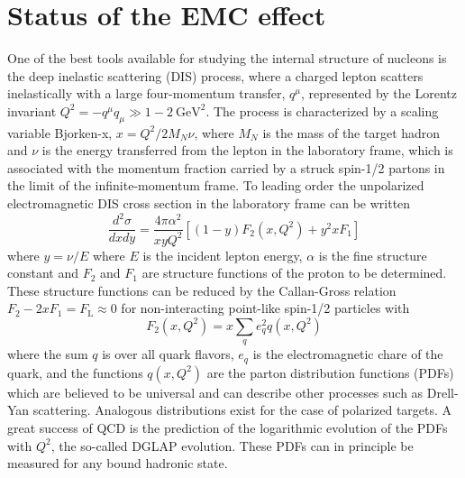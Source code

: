 \section{Status of the EMC effect}

One of the best tools available for studying the internal structure of nucleons is the deep inelastic
scattering (DIS) process, where a charged lepton scatters inelastically with a large four-momentum
transfer, $q^\mu$, represented by the Lorentz invariant $Q^2 = -q^\mu q_\mu \gg 1-2~\mathrm{GeV}^2$.
The process is characterized by a scaling variable Bjorken-x, $x = Q^2/2M_N \nu$, 
where $M_N$ is the mass of the target hadron and $\nu$ is the energy transferred from the lepton in the laboratory frame,
which is associated with the momentum fraction carried by a struck spin-1/2 partons in the limit of the infinite-momentum frame.
To leading order the unpolarized electromagnetic DIS cross section in the laboratory frame can be written~\cite{PhysRevD.98.030001}
\begin{equation}
    \frac{d^2 \sigma}{dx dy} = \frac{4 \pi \alpha^2}{x y Q^2} \left[ (1-y)F_2(x, Q^2) + y^2 x F_1 \right]
\end{equation}
where $y = \nu/E$ where $E$ is the incident lepton energy, $\alpha$ is the fine structure constant and $F_2$
and $F_1$ are structure functions of the proton to be determined.  These structure functions can be reduced
by the Callan-Gross relation $F_2 - 2xF_1 = F_\mathrm{L} \approx 0$ for non-interacting point-like spin-1/2
particles with
\begin{equation}
    F_2(x,Q^2) = x \sum_{q} e_q^2 q(x,Q^2)
\end{equation}
where the sum $q$ is over all quark flavors,  $e_q$ is the electromagnetic chare of the quark, and the
functions $q(x,Q^2)$ are the parton distribution functions (PDFs) which are believed to be universal
and can describe other processes such as Drell-Yan scattering.  Analogous distributions exist for the case of polarized
targets.  A great success of QCD is the prediction of the logarithmic 
evolution of the PDFs with $Q^2$, the so-called DGLAP evolution.  These PDFs can in principle be measured for any bound hadronic state.

